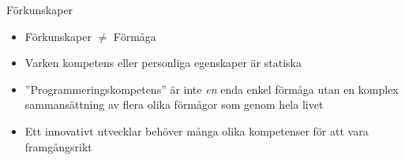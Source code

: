 \fi


\ifkompendium\else

\begin{SlideExtra}{Förkunskaper}
\begin{itemize}
\item Förkunskaper $\neq$ Förmåga
\item Varken kompetens eller personliga egenskaper är statiska
\item ''Programmeringskompetens'' är inte \textit{en} enda enkel förmåga utan en komplex sammansättning av flera olika förmågor som  genom hela livet
\item Ett innovativt utvecklar behöver många olika kompetenser för att vara framgångsrikt
\end{itemize}
\end{SlideExtra}





                                                      
                                                      


